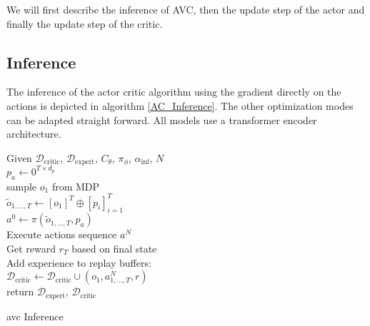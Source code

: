 We will first describe the inference of AVC, then the update step of the actor and finally the update step of the critic.

\subsection{Inference}
The inference of the actor critic algorithm using the gradient directly on the actions is depicted in algorithm \ref{AC_Inference}. 
The other optimization modes can be adapted straight forward. All models use a transformer encoder architecture. \\


\begin{algorithm}[H]
    \Require Given $\mathcal{D}_{\text{critic}}$, $\mathcal{D}_{\text{expert}}$,  
    $C_{\theta}$, $\pi_{\phi}$, $\alpha_{\mathrm{inf}}$, $N$\\
    \State $p_a \gets 0^{T \times d_p}$ \hfill{} \\
    \State sample $o_1$ from MDP\\
    \State $\tilde{o}_{1, ..., T} \gets [o_1]^T \oplus [p_i]_{i=1}^T$ \hfill{} \\
    \State $a^0 \gets \pi(\tilde{o}_{1, ..., T}, p_a)$\hfill{} \\
    \State Execute actions sequence $a^N$\\
    \State Get reward $r_T$ based on final state\\
    \State Add experience to replay buffers:\\
    \State $\mathcal{D}_{\text{critic}} \gets \mathcal{D}_{\text{critic}} \cup (o_1, a^N_{1, ..., T}, r)$\\
    return $\mathcal{D}_{\text{expert}}$, $\mathcal{D}_{\text{critic}}$
    \caption{\ac{avc} Inference}
    \label{AC_Inference}

\end{algorithm}


